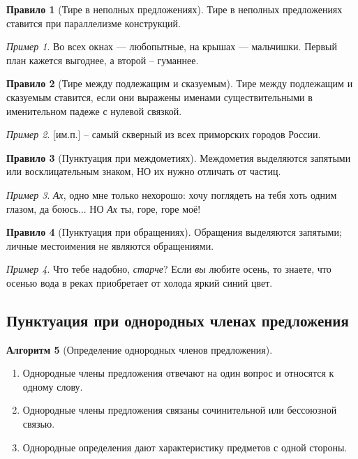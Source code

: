 \documentclass[12pt]{article}
\theoremstyle{definition}
\newtheorem{rrule}{Правило}[section]
\newtheorem{algorithm}[rrule]{Алгоритм}
\theoremstyle{remark}
\newtheorem*{example}{Пример}
\begin{document}
\begin{rrule}[Тире в неполных предложениях]
    Тире в неполных предложениях ставится при параллелизме конструкций.
    \begin{example}
        Во всех окнах — любопытные, на крышах — мальчишки. Первый план кажется выгоднее, а второй -- гуманнее.
    \end{example}
\end{rrule}

\begin{rrule}[Тире между подлежащим и сказуемым]
    Тире между подлежащим и сказуемым ставится, если они выражены именами существительными в именительном падеже с нулевой связкой.
    \begin{example}
        [им.п.] -- самый скверный  из всех приморских городов России.
    \end{example}
\end{rrule}

\begin{rrule}[Пунктуация при междометиях]
    Междометия выделяются запятыми или восклицательным знаком, НО их нужно отличать от частиц.
    \begin{example}
        \textsl{Ах}, одно мне только нехорошо: хочу поглядеть на тебя хоть одним глазом, да боюсь... НО \textsl{Ах} ты, горе, горе моё!
    \end{example}
\end{rrule}

\begin{rrule}[Пунктуация при обращениях]
    Обращения выделяются запятыми; личные местоимения не являются обращениями.
    \begin{example}
        Что тебе надобно, \textsl{старче}? Если \textsl{вы} любите осень, то знаете, что осенью вода в реках приобретает от холода яркий синий цвет.
    \end{example}
\end{rrule}

\subsection{Пунктуация при однородных членах предложения}

\begin{algorithm}[Определение однородных членов предложения]
    \hfill 
    \begin{enumerate}
        \item Однородные члены предложения отвечают на один вопрос и относятся к одному слову.
        \item Однородные члены предложения связаны сочинительной или бессоюзной связью.
        \item Однородные определения дают характеристику предметов с одной стороны.
    \end{enumerate}
\end{algorithm}
\end{document}
